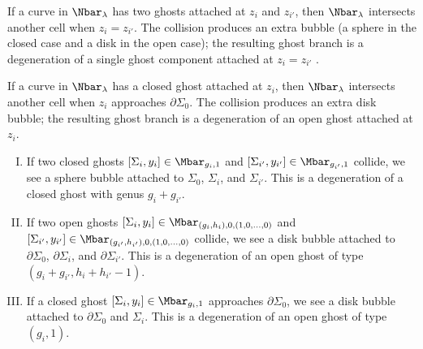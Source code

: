 If a curve in $\Nbar_\lambda$ has two ghosts attached at $z_i$ and $z_{i'}$, then $\Nbar_\lambda$ intersects another cell when $z_i=z_{i'}$. The collision produces an extra bubble (a sphere in the closed case and a disk in the open case); the resulting ghost branch is a degeneration of a single ghost component attached at $z_i=z_{i'}$ .

If a curve in $\Nbar_\lambda$ has a closed ghost attached at $z_i$, then $\Nbar_\lambda$ intersects another cell when $z_i$ approaches $\partial\Sigma_0$. The collision produces an extra disk bubble; the resulting ghost branch is a degeneration of an open ghost attached at $z_i$.

\begin{enumerate}[(I)]
\item If two closed ghosts $[\Sigma_i,y_i] \in \Mbar_{g_i,1}$ and $[\Sigma_{i'},y_{i'}] \in \Mbar_{g_{i'},1}$ collide, we see a sphere bubble attached to $\Sigma_0$, $\Sigma_i$, and $\Sigma_{i'}$. This is a degeneration of a closed ghost with genus $g_i+g_{i'}$. \label{collisionClosed}
\item If two open ghosts $[\Sigma_i,y_i] \in \Mbar_{(g_i,h_i),0,(1,0,\ldots,0)}$ and $[\Sigma_{i'},y_{i'}] \in \Mbar_{(g_{i'},h_{i'}),0,(1,0,\ldots,0)}$ collide, we see a disk bubble attached to $\partial\Sigma_0$, $\partial\Sigma_i$, and $\partial\Sigma_{i'}$. This is a degeneration of an open ghost of type $(g_i+g_{i'},h_i+h_{i'}-1)$. \label{collisionOpen}
\item If a closed ghost $[\Sigma_i,y_i] \in \Mbar_{g_i,1}$ approaches $\partial\Sigma_0$, we see a disk bubble attached to $\partial\Sigma_0$ and $\Sigma_i$. This is a degeneration of an open ghost of type $(g_i,1)$. \label{collisionBoundary}
\end{enumerate}

